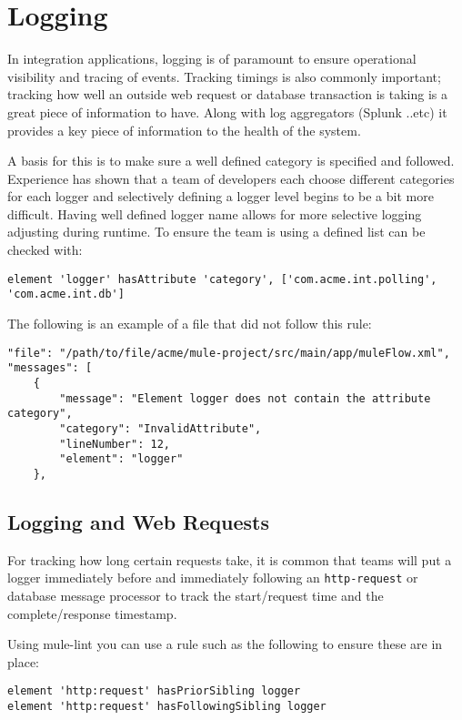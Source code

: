 \documentclass[a4paper,12pt]{article} %
\begin{document}
\section{Logging}

In integration applications, logging is of paramount to ensure operational visibility and tracing of events. Tracking timings is also commonly important; tracking how well an outside web request or database transaction is taking is a great piece of information to have. Along with log aggregators (Splunk ..etc) it provides a key piece of information to the health of the system.

A basis for this is to make sure a well defined category is specified and followed. Experience has shown that a team of developers each choose different categories for each logger and selectively defining a logger level begins to be a bit more difficult. Having well defined logger name allows for more selective logging adjusting during runtime. To ensure the team is using a defined list can be checked with:

\begin{Verbatim}[fontsize=\small]
element 'logger' hasAttribute 'category', ['com.acme.int.polling', 'com.acme.int.db']
\end{Verbatim}

The following is an example of a file that did not follow this rule:

\begin{Verbatim}[fontsize=\small]
"file": "/path/to/file/acme/mule-project/src/main/app/muleFlow.xml",
"messages": [
    {
        "message": "Element logger does not contain the attribute category",
        "category": "InvalidAttribute",
        "lineNumber": 12,
        "element": "logger"
    },
\end{Verbatim}

\subsection{Logging and Web Requests}
For tracking how long certain requests take, it is common that teams will put a logger immediately before and immediately following an \verb|http-request| or database message processor to track the start/request time and the complete/response timestamp.

Using mule-lint you can use a rule such as the following to ensure these are in place:

\begin{Verbatim}[fontsize=\small]
element 'http:request' hasPriorSibling logger
element 'http:request' hasFollowingSibling logger
\end{Verbatim}
\end{document}
